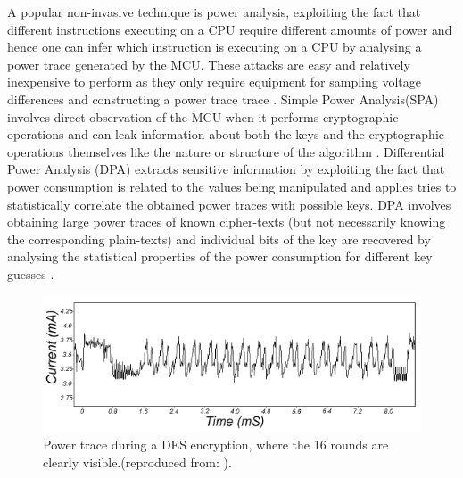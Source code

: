 A popular non-invasive technique is power analysis, exploiting the fact that different instructions executing on a CPU require different amounts of power \citep{website:riscure} \citep{kocher:DPA} and hence one can infer which instruction is executing on a CPU by analysing a power trace generated by the MCU. These attacks are easy and relatively inexpensive to perform as they only require equipment for sampling voltage differences and constructing a power trace trace \citep{kocher:DPA}. Simple Power Analysis(SPA) involves direct observation of the MCU when it performs cryptographic operations and can leak information about both the keys and the cryptographic operations themselves like the nature or structure of the algorithm \citep{kocher:DPA} \citep{anderson:tamper_resistance}. Differential Power Analysis (DPA) extracts sensitive information by exploiting the fact that power consumption is related to the values being manipulated and applies tries to statistically correlate the obtained power traces with possible keys. DPA involves obtaining large power traces of known cipher-texts (but not necessarily knowing the corresponding plain-texts) and individual bits of the key are recovered by analysing the statistical properties of the power consumption for different key guesses \citep{kocher:DPA}  \citep{anderson:tamper_resistance}.

	\begin{figure}
		\center
		\includegraphics[scale=0.6]{img/power_des.png}
		\caption{\footnotesize Power trace during a DES encryption, where the 16 rounds are clearly visible.(reproduced from: \protect\citep{kocher:DPA}).}
		\label{fig:des_power}		
	\end{figure}

